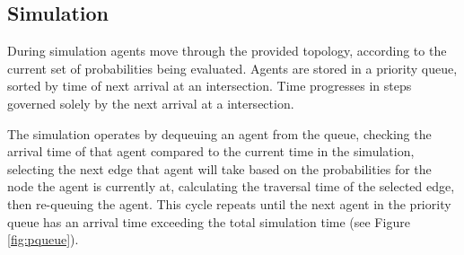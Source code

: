 \documentclass{sig-alternate-05-2015}
\begin{document}
%

\subsection{Simulation}
During simulation agents move through the provided topology, according
to the current set of probabilities being evaluated.  Agents are
stored in a priority queue, sorted by time of next arrival at an
intersection. Time progresses in steps governed solely by the next
arrival at a intersection.

The simulation operates by dequeuing an agent from the queue,
checking the arrival time of that agent compared to the current
time in the simulation, selecting the next edge that agent will take
based on the probabilities for the node the agent is currently at,
calculating the traversal time of the selected edge, then re-queuing the
agent. This cycle repeats until the next agent in the priority queue has an
arrival time exceeding the total simulation time (see Figure \ref{fig:pqueue}).

\end{document}
